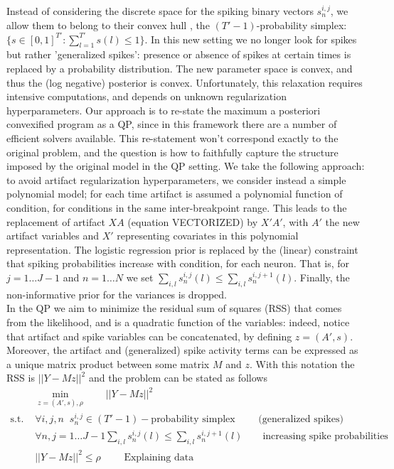 \documentclass[12pt,letterpaper,fleqn]{article}
\begin{document}
Instead of considering the discrete space for the spiking binary vectors $s_n^{i,j}$, we allow them to belong to their convex hull \cite{Rockafellar70}, the $(T'-1)$-probability simplex: $\{ s\in [0,1]^{T'}:  \sum_{l=1}^{T'} s(l)\leq 1\}$. In this new setting we no longer look for spikes but rather 'generalized spikes': presence or absence of spikes at certain times is replaced by a probability distribution. The new parameter space is convex, and thus the (log negative) posterior is convex. Unfortunately, this relaxation requires  intensive computations, and depends on unknown regularization hyperparameters. Our approach is to re-state the maximum a posteriori convexified program as a QP, since in this framework there are a number of efficient solvers available. This re-statement won't correspond exactly to the original problem, and the question is how to faithfully capture the structure imposed by the original model in the QP setting. We take the following approach: to avoid artifact regularization hyperparameters, we consider instead a simple polynomial model; for each time artifact is assumed a polynomial function of condition, for conditions in the same inter-breakpoint range. This leads to the replacement of artifact  $XA$ (equation VECTORIZED) by $X'A'$, with $A'$ the new artifact variables and $X'$ representing covariates in this polynomial representation. The logistic regression prior is replaced by the (linear) constraint that spiking probabilities increase with condition, for each neuron. That is, for $j=1\ldots J-1$ and $n=1\ldots N$ we set $\sum_{i,l}s_n^{i,j}(l) \leq \sum_{i,l}s_n^{i,j+1}(l)$. Finally, the non-informative prior for the variances is dropped.\\
In the QP we aim to minimize the residual sum of squares (RSS) that comes from the likelihood, and is a quadratic function of the variables: indeed, notice that artifact and spike variables can be concatenated, by defining $z=(A',s)$. Moreover, the artifact and (generalized) spike activity terms can be expressed as a unique matrix product between some matrix $M$ and $z$. With this notation the RSS is $||Y-Mz||^2$ and the problem can be stated as follows
  \begin{eqnarray}& \displaystyle{\min_{z=(A',s),\rho}\quad \quad  ||Y-Mz||^2} \\ \nonumber
  \text{s.t. } &  \forall i,j,n \;\; s_n^{i,j}\in (T'-1)-\text{probability simplex }\quad\quad \text{(generalized spikes)}\\ \nonumber
  & \forall n, j=1\ldots J-1\sum_{i,l}s_n^{i,j}(l) \leq \sum_{i,l}s_n^{i,j+1}(l)\quad \quad \text{increasing spike probabilities}\\ \nonumber 
  & ||Y-Mz||^2\leq \rho \quad \quad \text{ Explaining data} \\ \nonumber
\end{eqnarray}
\end{document}

